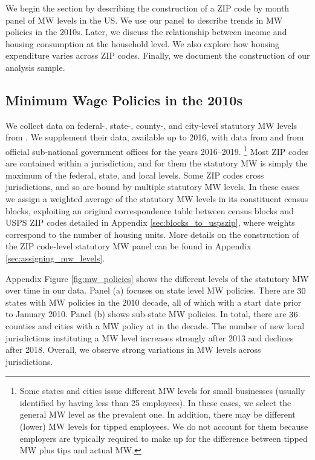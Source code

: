 
We begin the section by describing the construction of a ZIP code by month panel
of MW levels in the US. 
We use our panel to describe trends in MW policies in the 2010s.
Later, we discuss the relationship between income and housing consumption at the
household level.
We also explore how housing expenditure varies across ZIP codes.
Finally, we document the construction of our analysis sample.

\subsection{Minimum Wage Policies in the 2010s}
\label{sec:data_mw_panel}

We collect data on federal-, state-, county-, and city-level statutory MW levels 
from \textcite{VaghulZipperer2016}.
We supplement their data, available up to 2016, with data from 
\textcite{BerkeleyLaborCenter} and from official sub-national government offices 
for the years 2016--2019.%
\footnote{Some states and cities issue different MW levels for small businesses
(usually identified by having less than 25 employees).
In these cases, we select the general MW level as the prevalent one.
In addition, there may be different (lower) MW levels for tipped employees.
We do not account for them because employers are typically required to make up 
for the difference between tipped MW plus tips and actual MW.}
%
%
Most ZIP codes are contained within a jurisdiction, and for them the statutory 
MW is simply the maximum of the federal, state, and local levels.
Some ZIP codes cross jurisdictions, and so are bound by multiple statutory MW 
levels.
In these cases we assign a weighted average of the statutory MW levels in its
constituent census blocks, exploiting an original correspondence table between 
census blocks and USPS ZIP codes detailed in Appendix 
\ref{sec:blocks_to_uspszip}, where weights correspond to the number of housing
units.
More details on the construction of the ZIP code-level statutory MW panel 
can be found in Appendix \ref{sec:assigning_mw_levels}.

Appendix Figure \ref{fig:mw_policies} shows the different levels of the 
statutory MW over time in our data.
Panel (a) focuses on state level MW policies.
There are $\textnormal{30}$ states with MW policies in the 2010 decade, all of 
which with a start date prior to January 2010.
Panel (b) shows sub-state MW policies.
In total, there are $\textnormal{36}$ counties and cities with a MW policy at 
in the decade.
The number of new local jurisdictions instituting a MW level increases strongly 
after 2013 and declines after 2018.
Overall, we observe strong variations in MW levels across jurisdictions.

